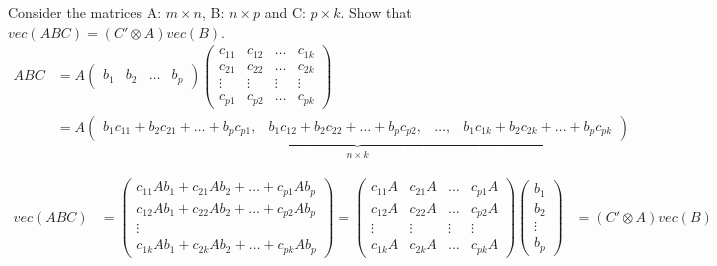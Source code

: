 \documentclass{article}
\begin{document}
Consider the matrices A: $m\times n$, B: $n\times p$ and C: $p\times k$. Show that $vec(ABC)=\left(C'\otimes A\right) vec(B)$.
\begin{align*}
  ABC &= A \begin{pmatrix} b_1 & b_2 & \dots & b_p \end{pmatrix}
  \begin{pmatrix}
  c_{11} &c_{12} &\dots &c_{1k} \\
  c_{21} &c_{22} &\dots &c_{2k} \\
  \vdots &\vdots &\vdots &\vdots\\
  c_{p1} &c_{p2} &\dots &c_{pk}
  \end{pmatrix}\\
  &= A \underbrace{\begin{pmatrix} b_1c_{11}+b_2c_{21}+\dots+b_p c_{p1},& b_1c_{12}+b_2c_{22}+\dots+b_p c_{p2}, & \dots ,& b_1c_{1k}+b_2c_{2k}+\dots+b_p c_{pk}\end{pmatrix}}_{n\times k}
  \end{align*}

\begin{align*}
  vec(ABC) &= \begin{pmatrix} c_{11}A b_1 +c_{21}A b_2+\dots+ c_{p1}A b_p\\ c_{12}A b_1+c_{22} A b_2 + \dots +  c_{p2} A b_p \\ \vdots \\ c_{1k}A b_1+ c_{2k} A b_2 +\dots+ c_{pk} A b_p  \end{pmatrix}
  = \begin{pmatrix} c_{11}A &  c_{21}A  & \dots & c_{p1}A \\ c_{12}A  & c_{22} A & \dots & c_{p2} A\\ \vdots & \vdots &\vdots&\vdots \\ c_{1k}A & c_{2k} A &\dots& c_{pk} A  \end{pmatrix} \begin{pmatrix} b_1\\b_2\\ \vdots\\b_p\end{pmatrix}
  &= \left(C'\otimes A\right) vec(B)
\end{align*}
\end{document}
